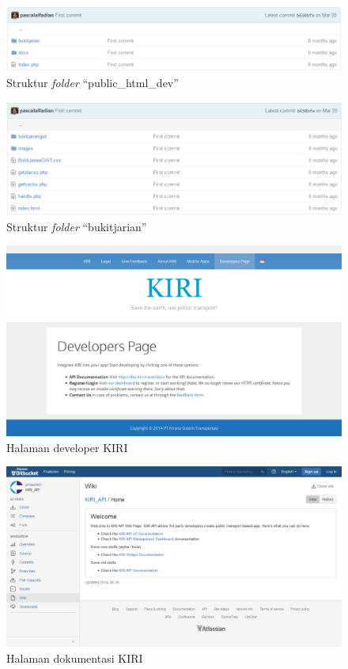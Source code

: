 \begin{figure}[htbp]
	\centering
		\includegraphics[scale=0.5]{Gambar/3_public_html_dev.png}
	\caption{Struktur \textit{folder} ``public\_html\_dev''}
	\label{fig:3_public_html_dev}
\end{figure}

\begin{figure}[htbp]
	\centering
		\includegraphics[scale=0.5]{Gambar/3_bukit_jarian.png}
	\caption{Struktur \textit{folder} ``bukitjarian''}
	\label{fig:3_bukit_jarian}
\end{figure}

\begin{figure}[htbp]
	\centering
		\includegraphics[scale=0.35]{Gambar/3_developer.png}
	\caption{Halaman developer KIRI}
	\label{fig:3_developer}
\end{figure}

\begin{figure}[htbp]
	\centering
		\includegraphics[scale=0.35]{Gambar/3_dokumentasi.png}
	\caption{Halaman dokumentasi KIRI}
	\label{fig:3_dokumentasi}
\end{figure}


